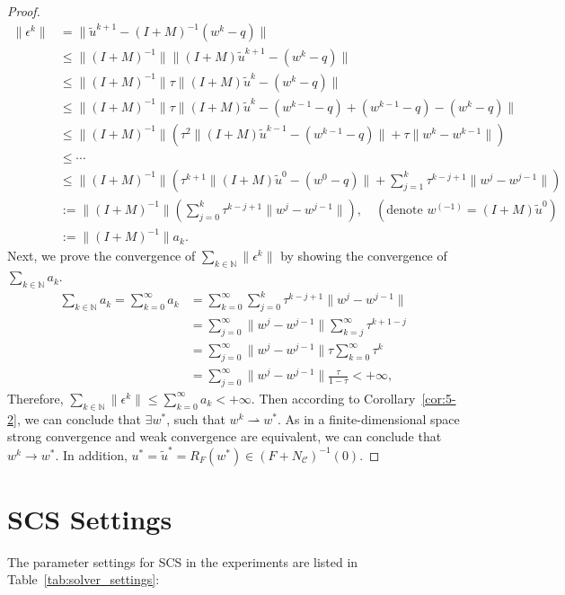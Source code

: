 \documentclass[10pt]{article} %
\begin{document}
\begin{proof}
$$
\begin{aligned}
    \|\epsilon^k\| &= \|\tilde{u}^{k+1} - (I+M)^{-1}(w^k-q)\|  \\
    &\leq \|(I+M)^{-1}\|\|(I+M)\tilde{u}^{k+1} - (w^k-q)\|\\
    &\leq \|(I+M)^{-1}\|\tau \|(I+M)\tilde{u}^{k} - (w^k-q)\|\\
    &\leq \|(I+M)^{-1}\| \tau \|(I+M)\tilde{u}^k - (w^{k-1}-q) + (w^{k-1}-q) -(w^k-q)\|  \\
    & \leq \|(I+M)^{-1}\| (\tau^2 \|(I+M)\tilde{u}^{k-1} - (w^{k-1}-q)\| + \tau \|w^k - w^{k-1}\|) \\
    & \leq \cdots \\
    & \leq \|(I+M)^{-1}\| (\tau^{k+1} \|(I+M)\tilde{u}^0 - (w^0-q)\| + \sum_{j=1}^k \tau^{k-j+1} \|w^j-w^{j-1}\|) \\
    & := \|(I+M)^{-1}\| \left(\sum_{j=0}^k \tau^{k-j+1}\|w^j-w^{j-1}\|\right), \quad \left(\text{denote } w^{(-1)} = (I+M)\tilde{u}^0\right)  \\
    &:= \|(I+M)^{-1}\| a_k.
\end{aligned}
$$
Next, we prove the convergence of $\sum_{k\in\mathbb{N}}\|\epsilon^k\|$ by showing the convergence of $\sum_{k\in\mathbb{N}} a_k$.
$$
\begin{aligned}
    \sum_{k\in\mathbb{N}} a_k = \sum_{k=0}^{\infty}a_k &= \sum_{k=0}^\infty\sum_{j=0}^k \tau^{k-j+1}\|w^j-w^{j-1}\| \\
        &= \sum_{j=0}^\infty\|w^j-w^{j-1}\|\sum_{k=j}^\infty \tau^{k+1-j} \\
        &= \sum_{j=0}^\infty\|w^j-w^{j-1}\| \tau \sum_{k=0}^\infty \tau ^k\\
        &= \sum_{j=0}^\infty\|w^j-w^{j-1}\| \frac{\tau}{1-\tau} < +\infty,
 \end{aligned}
$$
Therefore, $\sum_{k\in\mathbb{N}} \|\epsilon^k\| \leq \sum_{k=0}^\infty a_k < +\infty$. 
Then according to Corollary~\ref{cor:5-2}, we can conclude that $\exists w^*$, such that $w^k \rightharpoonup  w^*$.
As in a finite-dimensional space strong convergence and weak convergence are equivalent, we can conclude that $w^k \to w^*$.
In addition, $u^* = \tilde{u}^* = R_F(w^*) \in (F+N_\mathcal{C})^{-1}(0)$.
\end{proof}

\section{SCS Settings}
\label{appendix:solver_settings}
The parameter settings for SCS in the experiments are listed in Table~\ref{tab:solver_settings}:
\end{document}
